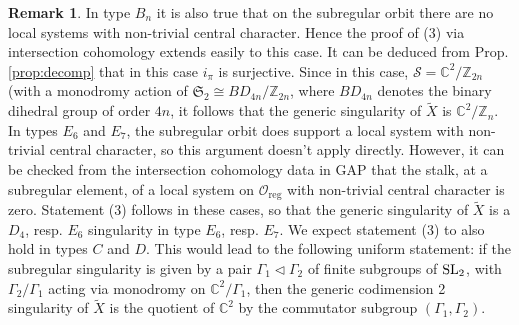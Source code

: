 \documentclass{amsart}
\theoremstyle{definition}
\newtheorem{remark}[theorem]{Remark}
\DeclareMathOperator{\reg}{reg}
\newcommand{\C}{\mathbb{C}}
\newcommand{\Z}{\mathbb{Z}}
\newcommand{\cS}{\mathcal{S}}
\newcommand{\g}{\mathfrak{g}}
\newcommand{\0}{\mathcal{O}}
\begin{document}
\begin{remark}
In type $B_n$ it is also true that on the subregular orbit there are no local systems with non-trivial central character.
Hence the proof of (3) via intersection cohomology extends easily to this case.
It can be deduced from Prop. \ref{prop:decomp} that in this case $i_\pi$ is surjective.
Since in this case, ${\mathcal S}=\C^2/\Z_{2n}$ (with a monodromy action of $\mathfrak{S}_2\cong BD_{4n}/\Z_{2n}$, where $BD_{4n}$ denotes the binary dihedral group of order $4n$, it follows that the generic singularity of $\widetilde{X}$ is $\C^2/\Z_n$.
In types $E_6$ and $E_7$, the subregular orbit does support a local system with non-trivial central character, so this argument doesn't apply directly.
However, it can be checked from the intersection cohomology data in GAP that the stalk, at a subregular element, of a local system on $\0_{\reg}$ with non-trivial central character is zero.
Statement (3) follows in these cases, so that the generic singularity of $\widetilde{X}$ is a $D_4$, resp. $E_6$ singularity in type $E_6$, resp. $E_7$.
We expect statement (3) to also hold in types $C$ and $D$.
This would lead to the following uniform statement: if the subregular singularity is given by a pair $\Gamma_1\lhd \Gamma_2$ of finite subgroups of ${\rm SL}_2$, with $\Gamma_2/\Gamma_1$ acting via monodromy on $\C^2/\Gamma_1$, then the generic codimension 2 singularity of $\widetilde{X}$ is the quotient of $\C^2$ by the commutator subgroup $(\Gamma_1,\Gamma_2)$.
\end{remark}



\end{document}
